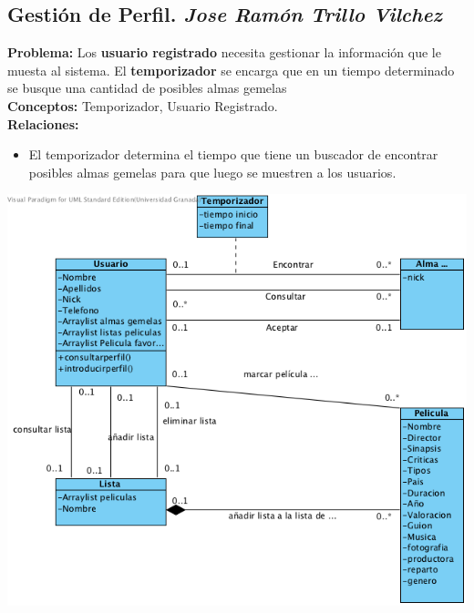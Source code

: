 \documentclass{article}
\begin{document}
	\subsection*{Gestión de Perfil. \textit{Jose Ramón Trillo Vilchez}}
	\textbf{Problema:} Los \textbf{usuario registrado} necesita gestionar la información que le muesta al sistema.
El \textbf{temporizador} se encarga que en un tiempo determinado se busque una cantidad de posibles almas gemelas\\
\textbf{Conceptos:} Temporizador, Usuario Registrado.\\
\textbf{	Relaciones:}
	\begin{itemize}
    	\item El temporizador determina el tiempo que tiene un buscador de encontrar posibles almas gemelas para que luego se muestren a los usuarios.      	
    \end{itemize}
    		\includegraphics[width=1\linewidth]{./C-Perfil}

\end{document}

